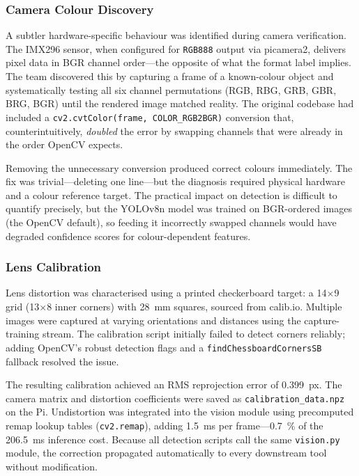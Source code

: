 \subsubsection{Camera Colour Discovery}\label{sec:field-colour}

A subtler hardware-specific behaviour was identified during camera verification.  The IMX296 sensor, when configured for \texttt{RGB888} output via picamera2, delivers pixel data in BGR channel order---the opposite of what the format label implies.  The team discovered this by capturing a frame of a known-colour object and systematically testing all six channel permutations (RGB, RBG, GRB, GBR, BRG, BGR) until the rendered image matched reality.  The original codebase had included a \texttt{cv2.cvtColor(frame, COLOR\_RGB2BGR)} conversion that, counterintuitively, \emph{doubled} the error by swapping channels that were already in the order OpenCV expects.

Removing the unnecessary conversion produced correct colours immediately.  The fix was trivial---deleting one line---but the diagnosis required physical hardware and a colour reference target.  The practical impact on detection is difficult to quantify precisely, but the YOLOv8n model was trained on BGR-ordered images (the OpenCV default), so feeding it incorrectly swapped channels would have degraded confidence scores for colour-dependent features.

\subsubsection{Lens Calibration}\label{sec:field-lens}

Lens distortion was characterised using a printed checkerboard target: a 14$\times$9 grid (13$\times$8 inner corners) with 28~mm squares, sourced from calib.io.  Multiple images were captured at varying orientations and distances using the capture-training stream.  The calibration script initially failed to detect corners reliably; adding OpenCV's robust detection flags and a \texttt{findChessboardCornersSB} fallback resolved the issue.

The resulting calibration achieved an RMS reprojection error of \SI{0.399}{px}.  The camera matrix and distortion coefficients were saved as \texttt{calibration\_data.npz} on the Pi.  Undistortion was integrated into the vision module using precomputed remap lookup tables (\texttt{cv2.remap}), adding \SI{1.5}{\milli\second} per frame---\SI{0.7}{\percent} of the \SI{206.5}{\milli\second} inference cost.  Because all detection scripts call the same \texttt{vision.py} module, the correction propagated automatically to every downstream tool without modification.

